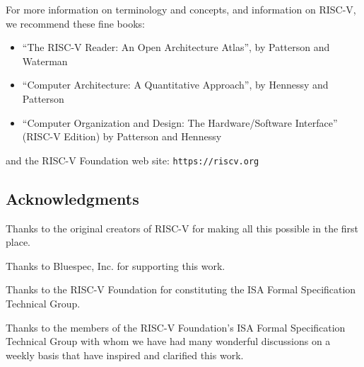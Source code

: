 \documentclass[11pt]{article}
\begin{document}
\vspace*{1cm}

For more information on terminology and concepts, and information on RISC-V, we recommend these fine books:

\begin{itemize}
\item
``The RISC-V Reader: An Open Architecture Atlas'', by Patterson and Waterman~\cite{Patterson2017b}

\item
``Computer Architecture: A Quantitative Approach'', by Hennessy and Patterson~\cite{Hennessy2017}

\item
``Computer Organization and Design: The Hardware/Software Interface'' (RISC-V Edition) by
     Patterson and Hennessy~\cite{Patterson2017a}
\end{itemize}

and the RISC-V Foundation web site: \verb|https://riscv.org|


\subsection*{Acknowledgments}

Thanks to the original creators of RISC-V for making all this possible in the first place.

Thanks to Bluespec, Inc. for supporting this work.

Thanks to the RISC-V Foundation for constituting the ISA Formal
Specification Technical Group.

Thanks to the members of the RISC-V Foundation's ISA Formal
Specification Technical Group with whom we have had many wonderful
discussions on a weekly basis that have inspired and clarified this
work.


\newpage

\pagestyle{myheadings}


{\small

\tableofcontents

}


\end{document}
